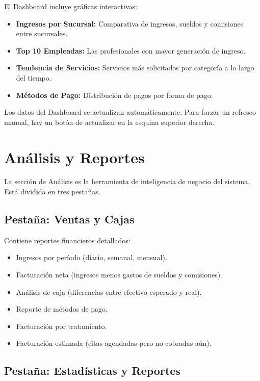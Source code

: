 \documentclass[12pt,a4paper]{article}
\begin{document}
El Dashboard incluye gráficas interactivas:
\begin{itemize}[leftmargin=*]
  \item \textbf{Ingresos por Sucursal:} Comparativa de ingresos, sueldos y comisiones entre sucursales.
  \item \textbf{Top 10 Empleadas:} Las profesionales con mayor generación de ingreso.
  \item \textbf{Tendencia de Servicios:} Servicios más solicitados por categoría a lo largo del tiempo.
  \item \textbf{Métodos de Pago:} Distribución de pagos por forma de pago.
\end{itemize}

\begin{notabox}
Los datos del Dashboard se actualizan automáticamente. Para forzar un refresco manual, hay un botón de actualizar en la esquina superior derecha.
\end{notabox}

\newpage
\section{Análisis y Reportes}

La sección de Análisis es la herramienta de inteligencia de negocio del sistema. Está dividida en tres pestañas.

\subsection{Pestaña: Ventas y Cajas}

Contiene reportes financieros detallados:

\begin{itemize}[leftmargin=*]
  \item Ingresos por período (diario, semanal, mensual).
  \item Facturación neta (ingresos menos gastos de sueldos y comisiones).
  \item Análisis de caja (diferencias entre efectivo esperado y real).
  \item Reporte de métodos de pago.
  \item Facturación por tratamiento.
  \item Facturación estimada (citas agendadas pero no cobradas aún).
\end{itemize}

\subsection{Pestaña: Estadísticas y Reportes}
\end{document}
